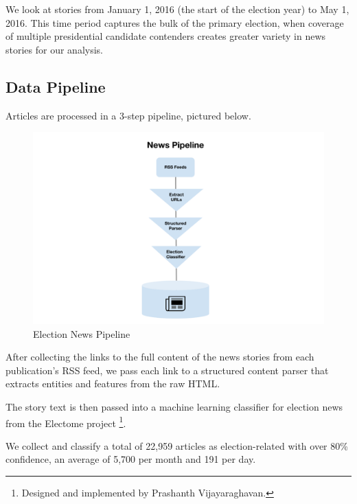 \documentclass[letterpaper]{article}
\begin{document}
 We look at stories from January 1, 2016 (the start of the election year) to May 1, 2016. This time period captures the bulk of the primary election, when coverage of multiple presidential candidate contenders creates greater variety in news stories for our analysis.
  
\subsection{Data Pipeline}

Articles are processed in a 3-step pipeline, pictured below.


\begin{figure}[t!]
\centering
\includegraphics[width=\columnwidth]{election-news-pipeline}  
\caption{Election News Pipeline
     \label{fig:data-stack}}
\end{figure}


After collecting the links to the full content of the news stories from each publication's RSS feed, we pass each link to a structured content parser that extracts entities and features from the raw HTML.

The story text is then passed into a machine learning classifier for election news from the Electome project \footnote{Designed and implemented by Prashanth Vijayaraghavan.}. 


 We collect and classify a total of 22,959 articles as election-related with over 80\% confidence, an average of 5,700 per month and 191 per day.
\end{document}
